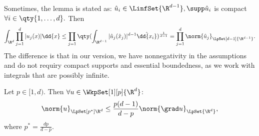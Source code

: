 \begin{remark}
	Sometimes, the lemma is stated as: $\hat{u}_i \in \LinfSet{\R^{d-1}}, \supp \hat{u}_i$ is compact $\forall i \in \qty{1,\dots,d}.$ Then
	\[
		\int_{\R^{d}}\prod_{j=1}^d|u_j(x)|\dd{x} \leq \prod_{j=1}\qty(\int_{\R^{d-1}}|\hat{u}_j(\hat{x}_j)|^{d-1}\hat{\dd{x_i}})^{\frac{1}{d-1}} = \prod_{j=1}^d \norm{\hat{u}_j}_{\LpSet[d-1]{\R^{d-1}}}.
	\]
	The difference is that in our version, we have nonnegativity in the assumptions and do not requiry compact supports and essential boundedness, as we work with integrals that are possibly infinite.
\end{remark}

\begin{theorem}
	Let $p \in [1,d).$ Then $\forall u \in \WkpSet[1][p]{\R^d}$:
	\[
		\norm{u}_{\LpSet[p^{*}]{\R^d}}\leq \frac{p(d-1)}{d-p} \norm{\grad u}_{\LpSet{\R^d}}, 
	\]
	where $p^{*}=\frac{dp}{d-p}.$
\end{theorem}

